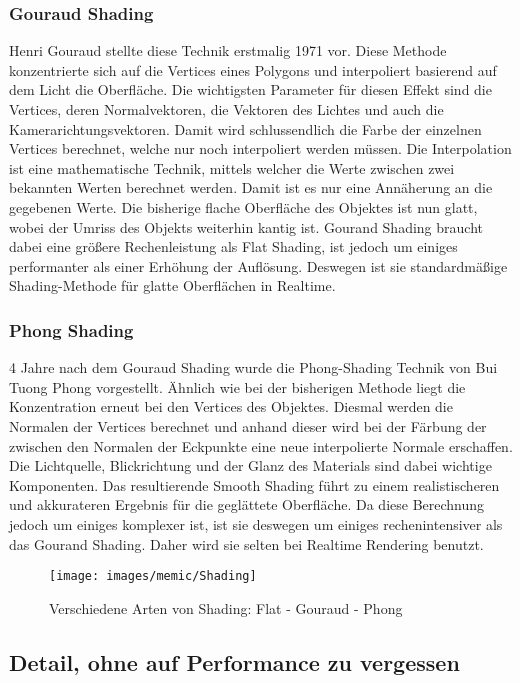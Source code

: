 \subsubsection{Gouraud Shading}

Henri Gouraud stellte diese Technik erstmalig 1971 vor. Diese Methode konzentrierte sich auf die Vertices eines Polygons und interpoliert basierend auf dem Licht die Oberfläche. Die wichtigsten Parameter für diesen Effekt sind die Vertices, deren Normalvektoren, die Vektoren des Lichtes und auch die Kamerarichtungsvektoren. Damit wird schlussendlich die Farbe der einzelnen Vertices berechnet, welche nur noch interpoliert werden müssen. Die Interpolation ist eine mathematische Technik, mittels welcher die Werte zwischen zwei bekannten Werten berechnet werden. Damit ist es nur eine Annäherung an die gegebenen Werte. Die bisherige flache Oberfläche des Objektes ist nun glatt, wobei der Umriss des Objekts weiterhin kantig ist. Gourand Shading braucht dabei eine größere Rechenleistung als Flat Shading, ist jedoch um einiges performanter als einer Erhöhung der Auflösung. Deswegen ist sie standardmäßige Shading-Methode für glatte Oberflächen in Realtime.

\subsubsection{Phong Shading}

4 Jahre nach dem Gouraud Shading wurde die Phong-Shading Technik von Bui Tuong Phong vorgestellt. Ähnlich wie bei der bisherigen Methode liegt die Konzentration erneut bei den Vertices des Objektes. Diesmal werden die Normalen der Vertices berechnet und anhand dieser wird bei der Färbung der zwischen den Normalen der Eckpunkte eine neue interpolierte Normale erschaffen. Die Lichtquelle, Blickrichtung und der Glanz des Materials sind dabei wichtige Komponenten. Das resultierende Smooth Shading führt zu einem realistischeren und akkurateren Ergebnis für die geglättete Oberfläche. Da diese Berechnung jedoch um einiges komplexer ist, ist sie deswegen um einiges rechenintensiver als das Gourand Shading. Daher wird sie selten bei Realtime Rendering benutzt.

\begin{figure}[H]
	\centering
	\texttt{[image: images/memic/Shading]}
	\caption{Verschiedene Arten von Shading: Flat - Gouraud - Phong}
	\end{figure}
\cite{_different_types_of_shading}

\subsection{Detail, ohne auf Performance zu vergessen}

